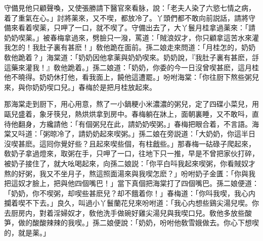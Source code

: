 守備見他只顧聲喚，又使張勝請下醫官來看脉，說：「老夫人染了六慾七情之病，着了重氣在心。」討將薬來，又不喫，都放冷了。丫頭們都不敢向前説話，請將守備來看着喫薬，只呷了一口，就不喫了。守備出去了，大丫鬟月桂拿過薬來：「請奶奶喫薬。」被春梅拿過來，劈臉只一潑，罵道：「賊浪奴才，你只顧拿這苦水來灌我怎的！我肚子裏有甚麽！」敎他跪在面前。孫二娘走來問道：「月桂怎的，奶奶敎他跪着？」海棠道：「奶奶因他拿薬與奶奶喫來。奶奶說，『我肚子裏有甚麽，㧱這藥來灌我！』敎他跪着。」孫二娘道：「奶奶，你委的今一日沒曾喫甚麽，這月桂他不曉得。奶奶休打他，看我面上，饒他這遭罷。」吩咐海棠：「你往厨下熬些粥兒來，與你奶奶喫口兒。」春梅於是把月桂放起來。

那海棠走到厨下，用心用意，熬了一小鍋粳小米濃濃的粥兒，定了四碟小菜兒，用甌兒盛着，象牙筷兒，熱烘烘拿到房中。春梅躺在牀上，面朝裏睡，又不敢呌，直待他翻身，方纔請他：「有個粥兒在此，請奶奶喫粥。」春梅把眼合着，不言語。海棠又呌道：「粥晾冷了，請奶奶起來喫粥。」孫二娘在旁説道：「大奶奶，你這半日沒喫甚麽。這囘你覺好些？且起來喫些個，有柱戧些。」那春梅一𥑮碌子爬起來，敎奶子拿過燈來，取粥在手，只呷了一口，往地下只一推，早是不曾把家伙打碎，被奶子接住了，就大吆喝起來，向孫二娘説：「你平白呌我起來喫粥，你看賊奴才熬的好粥，我又不坐月子，熬這照面湯來與我喫怎麽？」吩咐奶子金匱：「你與我把這奴才臉上，把與他四個嘴巴！」當下真個把海棠打了四個嘴巴。孫二娘便道：「奶奶，你不喫粥，却喫些甚麽兒？却不餓着你！」春梅道：「你呌我喫，我心内攔着喫不下去。」良久，叫過小丫鬟蘭花兒來吩咐道：「我心内想些鷄尖湯兒喫。你去厨房内，對着淫婦奴才，敎他洗手做碗好雞尖湯兒與我喫口兒。敎他多放些酸笋，做的酸酸辣辣的我喫。」孫二娘便說：「奶奶，吩咐他敎雪娥做去。你心下想喫的，就是薬。」

